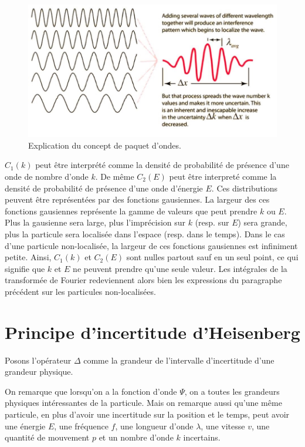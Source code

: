 \begin{figure}[ht!]
	\centering
	\includegraphics[scale=0.85]{img/wave_packets.jpg}
	\caption{Explication du concept de paquet d'ondes.}
	\label{fig:wave-packets}
\end{figure}

$C_1(k)$ peut être interprété comme la densité de probabilité
de présence d'une onde de nombre d'onde $k$. De même $C_2(E)$
peut être interpreté comme la densité de probabilité de
présence d'une onde d'énergie $E$. Ces distributions
peuvent être représentées par des fonctions gausiennes.
La largeur des ces fonctions gausiennes représente la
gamme de valeurs que peut prendre $k$ ou $E$. Plus la
gausienne sera large, plus l'imprécision sur $k$ (resp.
sur $E$) sera grande, plus la particule sera localisée
dans l'espace (resp. dans le temps).
Dans le cas d'une particule non-localisée, la largeur
de ces fonctions gausiennes est infiniment petite. Ainsi,
$C_1(k)$ et $C_2(E)$ sont nulles partout sauf en un seul
point, ce qui signifie que $k$
et $E$ ne peuvent prendre qu'une seule valeur.
Les intégrales de la transformée de Fourier
redeviennent alors bien les expressions du paragraphe
précédent sur les particules non-localisées.

\section{Principe d'incertitude d'Heisenberg}
\begin{mynota}
  Posons l'opérateur $\Delta$ comme
  la grandeur de l’intervalle d'incertitude
  d'une grandeur physique.
\end{mynota}

On remarque que lorsqu'on a la fonction d'onde $\Psi$,
on a toutes les grandeurs physiques intéressantes de la particule.
Mais on remarque aussi qu'une même particule,
en plus d'avoir une incertitude sur la position et le temps,
peut avoir une énergie $E$, une fréquence $f$,
une longueur d'onde $\lambda$, une vitesse $v$,
une quantité de mouvement $p$ et un nombre d'onde $k$ incertains.

